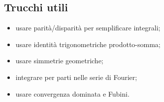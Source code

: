 \documentclass[a4paper,10pt]{article}
\begin{document}
\subsection{Trucchi utili}
\begin{itemize}
\item usare parità/disparità per semplificare integrali;
\item usare identità trigonometriche prodotto-somma;
\item usare simmetrie geometriche;
\item integrare per parti nelle serie di Fourier;
\item usare convergenza dominata e Fubini.
\end{itemize}
\end{document}
